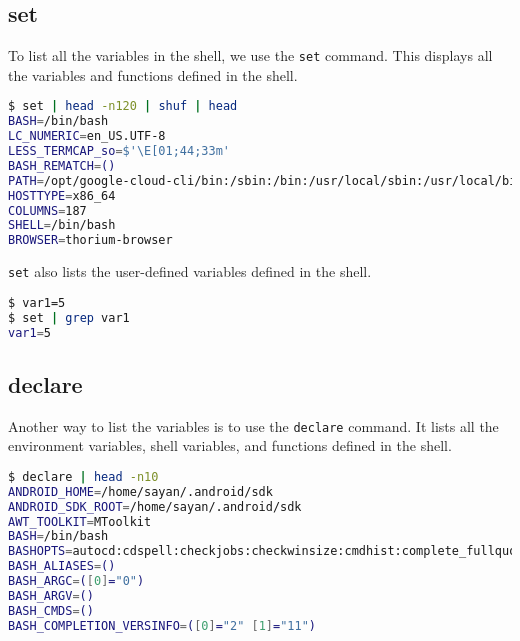 \subsection{set}

To list all the variables in the shell, we use the \lstinline{set} command.
This displays all the variables and functions defined in the shell.

\begin{lstlisting}[language=bash]
$ set | head -n120 | shuf | head
BASH=/bin/bash
LC_NUMERIC=en_US.UTF-8
LESS_TERMCAP_so=$'\E[01;44;33m'
BASH_REMATCH=()
PATH=/opt/google-cloud-cli/bin:/sbin:/bin:/usr/local/sbin:/usr/local/bin:/usr/bin:/usr/sbin:/opt/android-sdk/cmdline-tools/latest/bin:/opt/android-sdk/platform-tools:/opt/android-sdk/tools:/opt/android-sdk/tools/bin:/usr/lib/jvm/default/bin:/usr/bin/site_perl:/usr/bin/vendor_perl:/usr/bin/core_perl:/usr/lib/rustup/bin:/home/sayan/scripts:/home/sayan/.android/sdk:/home/sayan/.android/sdk/tools:/home/sayan/.android/sdk/platform-tools:/home/sayan/scripts:/home/sayan/.local/bin:/home/sayan/.pub-cache/bin:/usr/lib/jvm/default/bin:/home/sayan/.fzf/bin
HOSTTYPE=x86_64
COLUMNS=187
SHELL=/bin/bash
BROWSER=thorium-browser
\end{lstlisting}

\lstinline|set| also lists the user-defined variables defined in the shell.

\begin{lstlisting}[language=bash]
$ var1=5
$ set | grep var1
var1=5
\end{lstlisting}

\subsection{declare}

Another way to list the variables is to use the \lstinline{declare} command.
It lists all the environment variables, shell variables, and functions defined in the shell.

\begin{lstlisting}[language=bash]
$ declare | head -n10
ANDROID_HOME=/home/sayan/.android/sdk
ANDROID_SDK_ROOT=/home/sayan/.android/sdk
AWT_TOOLKIT=MToolkit
BASH=/bin/bash
BASHOPTS=autocd:cdspell:checkjobs:checkwinsize:cmdhist:complete_fullquote:execfail:expand_aliases:extglob:extquote:force_fignore:globasciiranges:globskipdots:histappend:interactive_comments:patsub_replacement:progcomp:promptvars:sourcepath
BASH_ALIASES=()
BASH_ARGC=([0]="0")
BASH_ARGV=()
BASH_CMDS=()
BASH_COMPLETION_VERSINFO=([0]="2" [1]="11")
\end{lstlisting}

